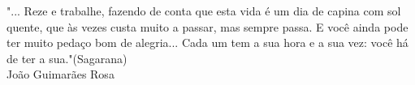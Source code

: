 "... Reze e trabalhe, fazendo de conta que esta vida é um dia de capina com sol quente, que às vezes custa muito a passar, mas sempre passa. E você ainda pode ter muito pedaço bom de alegria... Cada um tem a sua hora e a sua vez: você há de ter a sua."(Sagarana)\\
{ João Guimarães Rosa }